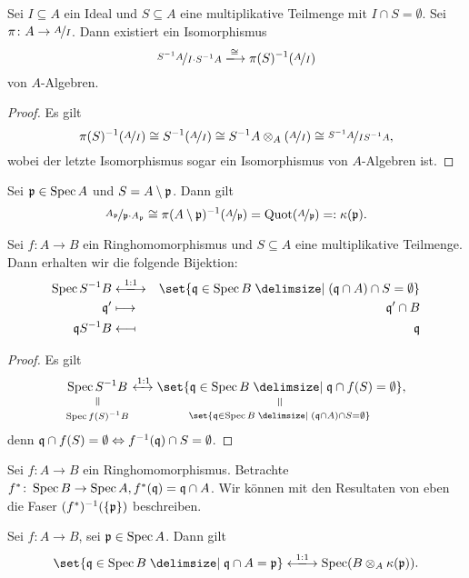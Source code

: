 \documentclass[12pt,a4paper]{scrartcl}
\theoremstyle{cplain}
\theoremstyle{cdef}
\begin{document}
\begin{kor}
	Sei $I\subseteq A$ ein Ideal und $S\subseteq A$ eine multiplikative Teilmenge mit $I\cap S = \emptyset$. Sei $\pi\colon A \to \nicefrac{A}{I}$. Dann existiert ein Isomorphismus
	\[\fak{S^{-1}A}{I\cdot S^{-1}A} \xlongrightarrow{\cong} \pi(S)^{-1}(\fak{A}{I})\]
	von $A$-Algebren.
\end{kor}
\begin{proof}
	Es gilt
	\[\pi(S)^{-1}(\nicefrac{A}{I}) \cong S^{-1}(\nicefrac{A}{I}) \cong S^{-1}A\otimes_A(\nicefrac{A}{I}) \cong \nicefrac{S^{-1}A}{IS^{-1}A},\]
	wobei der letzte Isomorphismus sogar ein Isomorphismus von $A$-Algebren ist.
\end{proof}
\begin{kor} \label{kor:5.18}
	Sei $\mathfrak{p}\in \operatorname{Spec} A$ und $S = A\setminus \mathfrak{p}$. Dann gilt
	\[\nicefrac{A_{\mathfrak{p}}}{\mathfrak{p}\cdot A_{\mathfrak{p}}}\cong \pi(A\setminus \mathfrak{p})^{-1}(\nicefrac{A}{\mathfrak{p}}) = \operatorname{Quot}(\nicefrac{A}{\mathfrak{p}}) =: \kappa(\mathfrak{p}).\]
\end{kor}
\begin{kor} \label{kor:5.19}
Sei $f\colon A\to B$ ein Ringhomomorphismus und $S\subseteq A$ eine multiplikative Teilmenge. Dann erhalten wir die folgende Bijektion:
\begin{eqnarray*}
	\Spec S^{-1}B & \xlongleftrightarrow{1:1} & \set{\fq \in \Spec B \given (\fq \cap A)\cap S = \emptyset}\\
	\fq' & \longmapsto & \fq'\cap B\\
	\fq S^{-1}B & \longmapsfrom & \fq
\end{eqnarray*}
\end{kor}
\begin{proof}
	Es gilt \[
		\equalto{\Spec S^{-1}B}{\Spec f(S)^{-1}B} 
		\xleftrightarrow{1:1} 
		\equalto{\set{\fq \in \Spec B\given\fq\cap f(S) = \emptyset}}{\set{\fq \in \Spec B\given(\fq \cap A)\cap S = \emptyset}},
	\]
	 denn $\mathfrak{q}\cap f(S) = \emptyset \Leftrightarrow f^{-1}(\mathfrak{q})\cap S = \emptyset$.
\end{proof}
Sei $f\colon A \to B$ ein Ringhomomorphismus. Betrachte $f^{*}\colon \operatorname{Spec} B \to \operatorname{Spec} A, f^{*}(\mathfrak{q}) = \mathfrak{q}\cap A$. Wir können mit den Resultaten von eben die Faser $(f^{*})^{-1}(\{\mathfrak{p}\})$ beschreiben.
\begin{kor}
	Sei $f\colon A \to B$, sei $\mathfrak{p}\in \operatorname{Spec} A$. Dann gilt
	\[\set{\fq\in \Spec B\given\fq\cap A = \fp}\xlongleftrightarrow{1:1}\Spec(B\tp_A\kappa(\fp)).\]
\end{kor}
\end{document}
